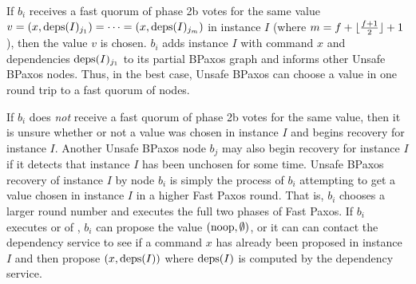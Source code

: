 If $b_i$ receives a fast quorum of phase 2b votes for the same value $v = (x,
\text{deps}(I)_{j_1}) = \cdots = (x, \text{deps}(I)_{j_m})$ in instance $I$ (where $m =
f + \lfloor\frac{f + 1}{2}\rfloor + 1$), then the value $v$ is chosen. $b_i$ adds instance $I$ with
command $x$ and dependencies $\text{deps}(I)_{j_1}$ to its partial BPaxos graph and
informs other Unsafe BPaxos nodes. Thus, in the best case, Unsafe BPaxos
can choose a value in one round trip to a fast quorum of nodes.

If $b_i$ does \emph{not} receive a fast quorum of phase 2b votes for the same
value, then it is unsure whether or not a value was chosen in instance $I$ and
begins recovery for instance $I$. Another Unsafe BPaxos node $b_j$ may also
begin recovery for instance $I$ if it detects that instance $I$ has been
unchosen for some time.
%
Unsafe BPaxos recovery of instance $I$ by node $b_i$ is simply the process
of $b_i$ attempting to get a value chosen in instance $I$ in a higher Fast
Paxos round. That is, $b_i$ chooses a larger round number and executes the full
two phases of Fast Paxos. If $b_i$ executes  or
 of , $b_i$ can propose the
value $(\text{noop}, \emptyset)$, or it can can contact the dependency service to see
if a command $x$ has already been proposed in instance $I$ and then propose
$(x, \text{deps}(I))$ where $\text{deps}(I)$ is computed by the dependency service.

